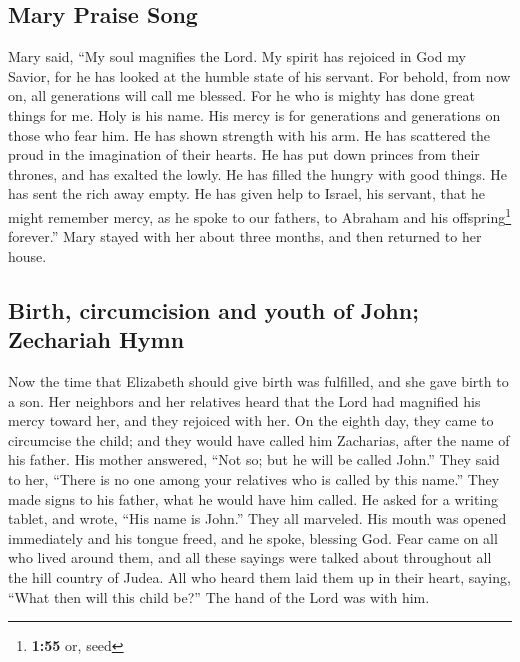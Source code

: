 \hypertarget{mary-praise-song}{%
\subsection{Mary Praise Song}\label{mary-praise-song}}

 Mary said, ``My soul magnifies the Lord. 
My spirit has rejoiced in God my Savior,  for he has
looked at the humble state of his servant. For behold, from now on, all
generations will call me blessed.  For he who is mighty
has done great things for me. Holy is his name.  His
mercy is for generations and generations on those who fear him.
 He has shown strength with his arm. He has scattered the
proud in the imagination of their hearts.  He has put
down princes from their thrones, and has exalted the lowly.
 He has filled the hungry with good things. He has sent
the rich away empty.  He has given help to Israel, his
servant, that he might remember mercy,  as he spoke to
our fathers, to Abraham and his offspring\footnote{\textbf{1:55} or,
  seed} forever.''  Mary stayed with her about three
months, and then returned to her house.

\hypertarget{birth-circumcision-and-youth-of-john-zechariah-hymn}{%
\subsection{Birth, circumcision and youth of John; Zechariah
Hymn}\label{birth-circumcision-and-youth-of-john-zechariah-hymn}}

 Now the time that Elizabeth should give birth was
fulfilled, and she gave birth to a son.  Her neighbors
and her relatives heard that the Lord had magnified his mercy toward
her, and they rejoiced with her.  On the eighth day, they
came to circumcise the child; and they would have called him Zacharias,
after the name of his father.  His mother answered, ``Not
so; but he will be called John.''  They said to her,
``There is no one among your relatives who is called by this name.''
 They made signs to his father, what he would have him
called.  He asked for a writing tablet, and wrote, ``His
name is John.'' They all marveled.  His mouth was opened
immediately and his tongue freed, and he spoke, blessing God.
 Fear came on all who lived around them, and all these
sayings were talked about throughout all the hill country of Judea.
 All who heard them laid them up in their heart, saying,
``What then will this child be?'' The hand of the Lord was with him.

